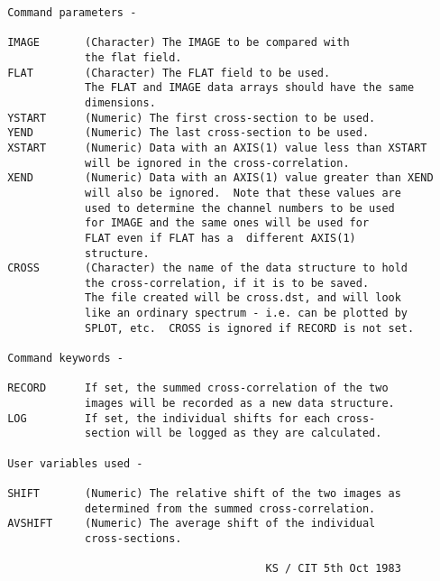 \begin{description}
\begin{verbatim}
 Command parameters -

 IMAGE       (Character) The IMAGE to be compared with
             the flat field.
 FLAT        (Character) The FLAT field to be used.
             The FLAT and IMAGE data arrays should have the same
             dimensions.
 YSTART      (Numeric) The first cross-section to be used.
 YEND        (Numeric) The last cross-section to be used.
 XSTART      (Numeric) Data with an AXIS(1) value less than XSTART
             will be ignored in the cross-correlation.
 XEND        (Numeric) Data with an AXIS(1) value greater than XEND
             will also be ignored.  Note that these values are
             used to determine the channel numbers to be used
             for IMAGE and the same ones will be used for
             FLAT even if FLAT has a  different AXIS(1)
             structure.
 CROSS       (Character) the name of the data structure to hold
             the cross-correlation, if it is to be saved.
             The file created will be cross.dst, and will look
             like an ordinary spectrum - i.e. can be plotted by
             SPLOT, etc.  CROSS is ignored if RECORD is not set.

 Command keywords -

 RECORD      If set, the summed cross-correlation of the two
             images will be recorded as a new data structure.
 LOG         If set, the individual shifts for each cross-
             section will be logged as they are calculated.

 User variables used -

 SHIFT       (Numeric) The relative shift of the two images as
             determined from the summed cross-correlation.
 AVSHIFT     (Numeric) The average shift of the individual
             cross-sections.

                                         KS / CIT 5th Oct 1983
\end{verbatim}
\end{description}
